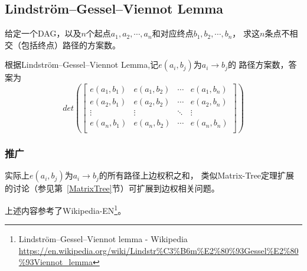 \subsection{Lindström–Gessel–Viennot Lemma}
给定一个DAG，以及$n$个起点$a_1,a_2,\cdots,a_n$和对应终点$b_1,b_2,\cdots,b_n$，
求这$n$条点不相交（包括终点）路径的方案数。

根据Lindström–Gessel–Viennot Lemma,记$e(a_i,b_j)$为$a_i\rightarrow b_j$的
路径方案数，答案为\begin{displaymath}
	det\left(\left[\begin{array}{cccc}
			e(a_1,b_1) & e(a_1,b_2) & \cdots & e(a_1,b_n) \\
			e(a_2,b_1) & e(a_2,b_2) & \cdots & e(a_2,b_n) \\
			\vdots     & \vdots     & \ddots & \vdots     \\
			e(a_n,b_1) & e(a_n,b_2) & \cdots & e(a_n,b_n) \\
		\end{array}\right]\right)
\end{displaymath}
\subsubsection{推广}
实际上$e(a_i,b_j)$为$a_i\rightarrow b_j$的所有路径上边权积之和，
类似Matrix-Tree定理扩展的讨论（参见第~\ref{MatrixTree}节）可扩展到边权相关问题。

上述内容参考了Wikipedia-EN\footnote{
	Lindström–Gessel–Viennot lemma - Wikipedia
	\url{https://en.wikipedia.org/wiki/Lindstr\%C3\%B6m\%E2\%80\%93Gessel\%E2\%80\%93Viennot\_lemma}
}。
